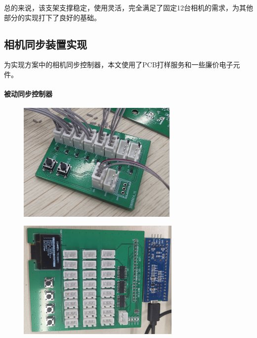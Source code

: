 总的来说，该支架支撑稳定，使用灵活，完全满足了固定12台相机的需求，为其他部分的实现打下了良好的基础。

\subsection{相机同步装置实现}
\label{sec:sync_impl}

为实现方案中的相机同步控制器，本文使用了PCB打样服务和一些廉价电子元件。

\paragraph{被动同步控制器}

\begin{figure}
    \centering
    \begin{minipage}{0.49\textwidth}
        \centering
        \includegraphics[height=5.8cm]{figures/passive_sync_controller}
        \label{fig:passive_sync_photo}
    \end{minipage}\hfill%
    \begin{minipage}{0.5\textwidth}
        \centering
        \includegraphics[height=5.8cm]{figures/active_sync_photo.jpg}
        \label{fig:active_sync_photo}
    \end{minipage}%
\end{figure}


